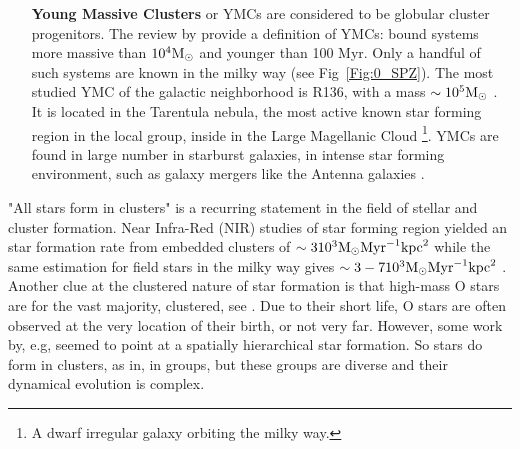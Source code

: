 \begin{itemize}
\item[\textbf{Young Massive Clusters}] or YMCs are considered to be globular cluster progenitors. The review by \cite{PortegiesZwart2010} provide a definition of YMCs: bound systems more massive than $10^4 {\textrm{M}_\odot}$ and younger than 100 Myr. Only a handful of such systems are known in the milky way (see Fig~\ref{Fig:0_SPZ}). The most studied YMC of the galactic neighborhood is R136, with a mass $\sim 10^5 {\textrm{M}_\odot}$ \citep{Andersen2009}. It is located in the Tarentula nebula, the most active known star forming region in the local group, inside in the Large Magellanic Cloud \footnote{A dwarf irregular galaxy orbiting the milky way.}. YMCs are found in large number in starburst galaxies, in intense star forming environment, such as galaxy mergers like the Antenna galaxies \citep{Whitmore2010}.

\end{itemize}

"All stars form in clusters" is a recurring statement in the field of stellar and cluster formation. Near Infra-Red (NIR) studies of star forming region yielded an star formation rate from embedded clusters of $\sim 3 10^3 {\textrm{M}_\odot} \textrm{Myr}^{-1} \textrm{kpc}^2$ \citep{Lada2003} while the same estimation for field stars in the milky way gives $\sim 3-7 10^3 {\textrm{M}_\odot} \textrm{Myr}^{-1} \textrm{kpc}^2$ \citep{Miller1979}. Another clue at the clustered nature of star formation is that high-mass O stars are for the vast majority, clustered, see \cite{DeWit2005}. Due to their short life, O stars are often observed at the very location of their birth, or not very far. However, some work by, e.g,  \cite{Gutermuth2011} seemed to point at a spatially hierarchical star formation. So stars do form in clusters, as in, in groups, but these groups are diverse and their dynamical evolution is complex.






%


